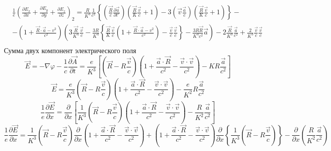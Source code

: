 \documentclass[11pt]{article}
\begin{document}
\[\begin{align}
  & \frac{1}{e}{{\left( \frac{\partial {{E}_{x}}}{\partial x}+\frac{\partial {{E}_{y}}}{\partial y}+\frac{\partial {{E}_{z}}}{\partial z} \right)}_{2}}=\frac{R}{{{K}^{3}}}\frac{1}{{{c}^{2}}}\left\{ \left( \frac{\overrightarrow{R}}{c}\frac{\partial \overrightarrow{a}}{\partial t'} \right)\left( \frac{\overrightarrow{R}}{K}\frac{\overrightarrow{v}}{c}+1 \right)-3\left( \overrightarrow{v}\frac{\overrightarrow{a}}{c} \right)\left( \frac{\overrightarrow{R}}{K}\frac{\overrightarrow{v}}{c}+1 \right) \right\}- \\
 & -\left( 1+\frac{\overrightarrow{R}\cdot \overrightarrow{a}-{{v}^{2}}}{{{c}^{2}}} \right)\left( 3\frac{\overrightarrow{R}}{{{K}^{4}}}\frac{\overrightarrow{v}}{c}-\frac{3R}{{{K}^{4}}}\left\{ \frac{\overrightarrow{R}}{K}\frac{\overrightarrow{v}}{c}\left( 1+\frac{\overrightarrow{R}\cdot \overrightarrow{a}-{{v}^{2}}}{{{c}^{2}}} \right)-\frac{\overrightarrow{v}}{c}\frac{\overrightarrow{v}}{c} \right\}-\frac{3R\overrightarrow{R}}{{{K}^{4}}{{c}^{2}}}\overrightarrow{a} \right)-2\frac{\overrightarrow{R}}{{{K}^{3}}}\frac{\overrightarrow{a}}{{{c}^{2}}}+\frac{2}{{{K}^{3}}}\frac{\overrightarrow{v}}{c}\frac{\overrightarrow{v}}{c} \\
\end{align}\] Сумма двух компонент электрического поля
\[\overrightarrow{E}=-\nabla \varphi -\frac{1}{c}\frac{\partial \overrightarrow{A}}{\partial t}=\frac{e}{{{K}^{3}}}\left[ \left( \overrightarrow{R}-R\frac{\overrightarrow{v}}{c} \right)\left( 1+\frac{\overrightarrow{a}\cdot \overrightarrow{R}}{{{c}^{2}}}-\frac{\overrightarrow{v}\cdot \overrightarrow{v}}{{{c}^{2}}} \right)-KR\frac{\overrightarrow{a}}{{{c}^{2}}} \right]\]
\[\overrightarrow{E}=\frac{e}{{{K}^{3}}}\left( \overrightarrow{R}-R\frac{\overrightarrow{v}}{c} \right)\left( 1+\frac{\overrightarrow{a}\cdot \overrightarrow{R}}{{{c}^{2}}}-\frac{\overrightarrow{v}\cdot \overrightarrow{v}}{{{c}^{2}}} \right)-\frac{e}{{{K}^{2}}}R\frac{\overrightarrow{a}}{{{c}^{2}}}\]
\[\frac{1}{e}\frac{\partial \overrightarrow{E}}{\partial x}=\frac{\partial }{\partial x}\left[ \frac{1}{{{K}^{3}}}\left( \overrightarrow{R}-R\frac{\overrightarrow{v}}{c} \right)\left( 1+\frac{\overrightarrow{a}\cdot \overrightarrow{R}}{{{c}^{2}}}-\frac{\overrightarrow{v}\cdot \overrightarrow{v}}{{{c}^{2}}} \right)-\frac{R}{{{K}^{2}}}\frac{\overrightarrow{a}}{{{c}^{2}}} \right]\]
\[\frac{1}{e}\frac{\partial \overrightarrow{E}}{\partial x}=\frac{1}{{{K}^{3}}}\left( \overrightarrow{R}-R\frac{\overrightarrow{v}}{c} \right)\frac{\partial }{\partial x}\left( 1+\frac{\overrightarrow{a}\cdot \overrightarrow{R}}{{{c}^{2}}}-\frac{\overrightarrow{v}\cdot \overrightarrow{v}}{{{c}^{2}}} \right)+\left( 1+\frac{\overrightarrow{a}\cdot \overrightarrow{R}}{{{c}^{2}}}-\frac{\overrightarrow{v}\cdot \overrightarrow{v}}{{{c}^{2}}} \right)\frac{\partial }{\partial x}\left\{ \frac{1}{{{K}^{3}}}\left( \overrightarrow{R}-R\frac{\overrightarrow{v}}{c} \right) \right\}-\frac{\partial }{\partial x}\left( \frac{R}{{{K}^{2}}}\frac{\overrightarrow{a}}{{{c}^{2}}} \right)\]
\end{document}

